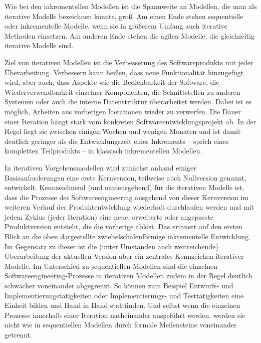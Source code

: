 Wie bei den inkrementellen Modellen ist die Spannweite an Modellen, die man als iterative Modelle bezeichnen könnte, groß. Am einen Ende stehen sequentielle oder inkrementelle Modelle, wenn sie in größerem Umfang auch iterative Methoden einsetzen. Am anderen Ende stehen die agilen Modelle, die gleichzeitig iterative Modelle sind.

Ziel von iterativen Modellen ist die Verbesserung des Softwareprodukts mit jeder Überarbeitung. Verbessern kann heißen, dass neue Funktionalität hinzugefügt wird, aber auch, dass Aspekte wie die Bedienbarkeit der Software, die Wiederverwendbarkeit einzelner Komponenten, die Schnittstellen zu anderen Systemen oder auch die interne Datenstruktur überarbeitet werden. Dabei ist es möglich, Arbeiten aus vorherigen Iterationen wieder zu verwerfen. Die Dauer einer Iteration hängt stark vom konkreten Softwareentwicklungsprojekt ab. In der Regel liegt sie zwischen einigen Wochen und wenigen Monaten und ist damit deutlich geringer als die Entwicklungszeit eines Inkrements – sprich eines kompletten Teilprodukts – in klassisch inkrementellen Modellen.

In iterativen Vorgehensmodellen wird zunächst anhand einiger Basis\-anforderungen eine erste Kernversion, teilweise auch Nullversion genannt, entwickelt. Kennzeichnend (und namensgebend) für die iterativen Modelle ist, dass die Prozesse des Softwareengineering ausgehend von dieser Kernversion im weiteren Verlauf der Produktentwicklung wiederholt durchlaufen werden und mit jedem Zyklus (jeder Iteration) eine neue, erweiterte oder angepasste Produktversion entsteht, die die vorherige ablöst. Das erinnert auf den ersten Blick an die oben dargestellte zwiebelschalenförmige inkrementelle Entwicklung. Im Gegensatz zu dieser ist die (unter Umständen auch weitreichende) Überarbeitung der aktuellen Version aber ein zentrales Kennzeichen iterativer Modelle. Im Unterschied zu sequentiellen Modellen sind die einzelnen Softwareengineering-Prozesse in iterativen Modellen zudem in der Regel deutlich schwächer voneinander abgegrenzt. So können zum Beispiel Entwurfs- und Implementierungstätigkeiten oder Implementierungs- und Testtätigkeiten eine Einheit bilden und Hand in Hand stattfinden. Und selbst wenn die einzelnen Prozesse innerhalb einer Iteration nacheinander ausgeführt werden, werden sie nicht wie in sequentiellen Modellen durch formale Meilensteine voneinander getrennt. 

